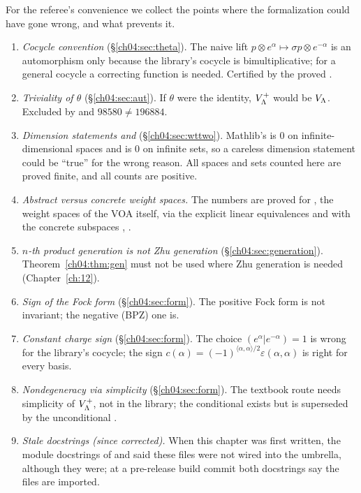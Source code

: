 For the referee's convenience we collect the points where the formalization could have gone wrong,
and what prevents it.
\begin{enumerate}[label=(\arabic*)]
\item \emph{Cocycle convention} (\S\ref{ch04:sec:theta}). The naive lift
  $p\otimes e^\alpha\mapsto\sigma p\otimes e^{-\alpha}$ is an automorphism only because the library's
  cocycle is bimultiplicative; for a general cocycle a correcting function is needed. Certified by the
  proved .
\item \emph{Triviality of $\theta$} (\S\ref{ch04:sec:aut}). If $\theta$ were the identity, $V_{\Lambda}^+$
  would be $V_{\Lambda}$. Excluded by  and $98580\neq196884$.
\item \emph{Dimension statements and } (\S\ref{ch04:sec:wttwo}). Mathlib's
   is $0$ on infinite-dimensional spaces and  is $0$ on infinite sets,
  so a careless dimension statement could be ``true'' for the wrong reason. All spaces and sets
  counted here are proved finite, and all counts are positive.
\item \emph{Abstract versus concrete weight spaces.} The numbers are proved for
  , the weight spaces of the VOA itself, via the explicit linear
  equivalences  and  with the
  concrete subspaces , .
\item \emph{$n$-th product generation is not Zhu generation} (\S\ref{ch04:sec:generation}).
  Theorem~\ref{ch04:thm:gen} must not be used where Zhu generation is needed (Chapter~\ref{ch:12}).
\item \emph{Sign of the Fock form} (\S\ref{ch04:sec:form}). The positive Fock form is not invariant;
  the negative (BPZ) one is.
\item \emph{Constant charge sign} (\S\ref{ch04:sec:form}). The choice $(e^\alpha|e^{-\alpha})=1$ is wrong
  for the library's cocycle; the sign $c(\alpha)=(-1)^{\langle\alpha,\alpha\rangle/2}\varepsilon(\alpha,\alpha)$ is
  right for every basis.
\item \emph{Nondegeneracy via simplicity} (\S\ref{ch04:sec:form}). The textbook route needs
  simplicity of $V_{\Lambda}^+$, not in the library; the conditional
   exists but is superseded by the unconditional
  .
\item \emph{Stale docstrings (since corrected).} When this chapter was first written, the module docstrings of
   and  said these files were not wired into the
  umbrella, although they were; at a pre-release build commit both docstrings say the files are imported.
\end{enumerate}

